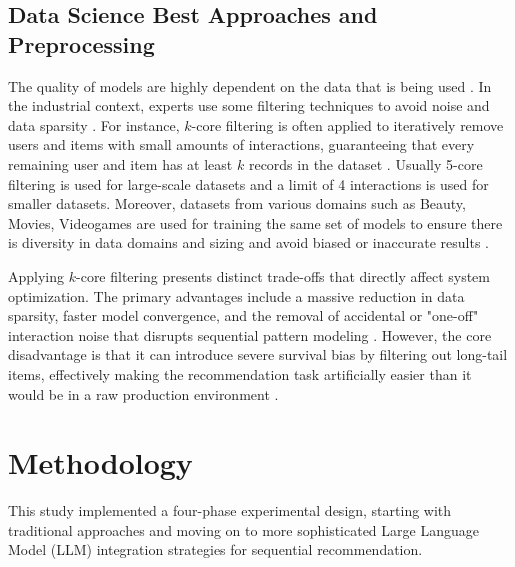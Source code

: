 \documentclass[conference]{IEEEtran}
\begin{document}
\subsection{Data Science Best Approaches and Preprocessing}\label{SCM}
The quality of models are highly dependent on the data that is being used \cite{b16, b17}. In the industrial context, experts use some filtering techniques to avoid noise and data sparsity \cite{b17}. For instance, $k$-core filtering is often applied to iteratively remove users and items with small amounts of interactions, guaranteeing that every remaining user and item has at least $k$ records in the dataset \cite{b17, b21}. Usually 5-core filtering is used for large-scale datasets and a limit of 4 interactions is used for smaller datasets. Moreover, datasets from various domains such as Beauty, Movies, Videogames are used for training the same set of models to ensure there is diversity in data domains and sizing and avoid biased or inaccurate results \cite{b2, b4}.

Applying $k$-core filtering presents distinct trade-offs that directly affect system optimization. The primary advantages include a massive reduction in data sparsity, faster model convergence, and the removal of accidental or "one-off" interaction noise that disrupts sequential pattern modeling \cite{b17,b21}. However, the core disadvantage is that it can introduce severe survival bias by filtering out long-tail items, effectively making the recommendation task artificially easier than it would be in a raw production environment \cite{b17}. 





\section{Methodology}
This study implemented a four-phase experimental design, starting with traditional approaches and moving on to more sophisticated Large Language Model (LLM) integration strategies for sequential recommendation.
\begin{table}[htbp]
\caption{Dataset Statistics}
\begin{center}
\label{tab_stats}
\end{center}
\end{table}
\end{document}
